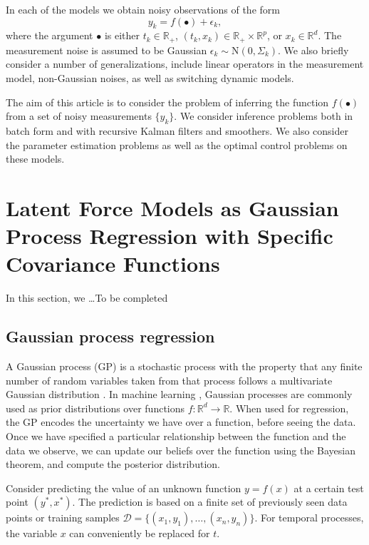 \documentclass[journal]{IEEEtran}
\newcommand{\simo}[1]{{\color{red}#1}}
\begin{document}
In each of the models we obtain noisy observations of the form
%
\begin{equation}
  y_k = f(\bullet) + \epsilon_k,
\end{equation}
%
where the argument $\bullet$ is either $t_k \in \mathbb{R}_+$, $(t_k,x_k) \in \mathbb{R}_+ \times \mathbb{R}^p$, or $x_k \in \mathbb{R}^d$. The measurement noise is assumed to be Gaussian $\epsilon_k \sim \mathrm{N}(0,\Sigma_k)$. We also briefly consider a number of generalizations, include linear operators in the measurement model, non-Gaussian noises, as well as switching dynamic models.

The aim of this article is to consider the problem of inferring the function $f(\bullet)$ from a set of noisy measurements $\{ y_k \}$. We consider inference problems both in batch form and with recursive Kalman filters and smoothers. We also consider the parameter estimation problems as well as the optimal control problems on these models.

\section{Latent Force Models as Gaussian Process Regression with Specific Covariance Functions}

In this section, we \ldots \simo{To be completed}

\subsection{Gaussian process regression}\label{sec:gp:regression}
%

A Gaussian process (GP) is a stochastic process with the property that any finite number of random variables taken from that process follows a multivariate Gaussian distribution \cite{Rasmussen+Williams:2006, Shanmugan:randomSignals:88}. In machine learning \cite{Rasmussen+Williams:2006}, Gaussian processes are commonly used as prior distributions over functions $f: \mathbb{R}^d\rightarrow \mathbb{R}$. When used for regression, the GP encodes the uncertainty we have over a function, before seeing the data. Once we have specified a particular relationship between the function and the data we observe, we can update our beliefs over the function using the Bayesian theorem, and compute the posterior distribution.

Consider predicting the value of an unknown function $y = f(x)$ at a certain test point $(y^*, x^*)$. The prediction
is based on a finite set of previously seen data points or training samples
$\mathcal{D}=\{(x_1, y_1), \ldots, (x_n, y_n)\}$. For temporal processes, the variable $x$ can conveniently be
replaced for $t$.
\end{document}
